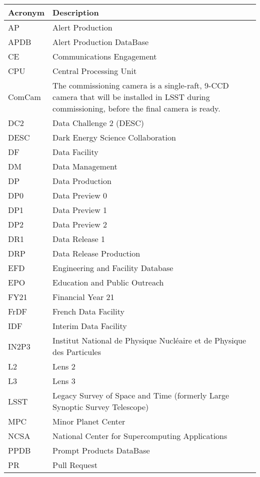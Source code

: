 \addtocounter{table}{-1}
\begin{longtable}{p{}p{}}\hline
\textbf{Acronym} & \textbf{Description}  \\\hline

AP & Alert Production \\\hline
APDB & Alert Production DataBase \\\hline
CE & Communications Engagement \\\hline
CPU & Central Processing Unit \\\hline
ComCam & The commissioning camera is a single-raft, 9-CCD camera that will be installed in LSST during commissioning, before the final camera is ready. \\\hline
DC2 & Data Challenge 2 (DESC) \\\hline
DESC & Dark Energy Science Collaboration \\\hline
DF & Data Facility \\\hline
DM & Data Management \\\hline
DP & Data Production \\\hline
DP0 & Data Preview 0 \\\hline
DP1 & Data Preview 1 \\\hline
DP2 & Data Preview 2 \\\hline
DR1 & Data Release 1 \\\hline
DRP & Data Release Production \\\hline
EFD & Engineering and Facility Database \\\hline
EPO & Education and Public Outreach \\\hline
FY21 & Financial Year 21 \\\hline
FrDF & French Data Facility \\\hline
IDF & Interim Data Facility \\\hline
IN2P3 & Institut National de Physique Nucléaire et de Physique des Particules \\\hline
L2 & Lens 2 \\\hline
L3 & Lens 3 \\\hline
LSST & Legacy Survey of Space and Time (formerly Large Synoptic Survey Telescope) \\\hline
MPC & Minor Planet Center \\\hline
NCSA & National Center for Supercomputing Applications \\\hline
PPDB & Prompt Products DataBase \\\hline
PR & Pull Request \\\hline

\end{longtable}
